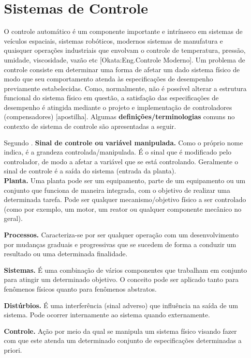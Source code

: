 \section{Sistemas de Controle}
\label{sec:sistema_controle}
O controle automático é um componente importante e intrínseco em sistemas de veículos espaciais, sistemas robóticos, modernos sistemas de manufatura e quaisquer operações industriais que envolvam o controle de temperatura, pressão, umidade, viscosidade, vazão etc \cite{ogata2011engenharia} [Okata:Eng.Controle Moderno]. Um problema de controle consiste em determinar uma forma de afetar um dado sistema físico de modo que seu comportamento atenda às especificações de desempenho previamente estabelecidas. Como, normalmente, não é possível alterar a estrutura funcional do sistema físico em questão, a satisfação das especificações de desempenho é atingida mediante o projeto e implementação de controladores (compensadores) [apostilha]. Algumas \textbf{definições/terminologias} comuns no contexto de sistema de controle são apresentadas a seguir.

Segundo \cite{ogata2011engenharia}.
\textbf{Sinal de controle ou variável manipulada.} Como o próprio nome indica, é a grandeza controlada/manipulada. É o sinal que é modificado pelo controlador, de modo a afetar a variável que se está controlando. Geralmente o sinal de controle é a saída do sistema (entrada da planta).\\

\textbf{Planta.} Uma planta pode ser um equipamento, parte de um equipamento ou um conjunto que funciona de maneira integrada, com o objetivo de realizar uma determinada tarefa. Pode ser qualquer mecanismo/objetivo físico a ser controlado (como por exemplo, um motor, um reator ou qualquer componente mecânico no geral).

\textbf{Processos.} Caracteriza-se por ser qualquer operação com um desenvolvimento por mudanças graduais e progressivas que se sucedem de forma a conduzir um resultado ou uma determinada finalidade.

\textbf{Sistemas.} É uma combinação de vários componentes que trabalham em conjunto para atingir um determinado objetivo. O conceito pode ser aplicado tanto para fenômenos físicos quanto para fenômenos abstratos.

\textbf{Distúrbios.} É uma interferência (sinal adverso) que influência na saída de um sistema. Pode ocorrer internamente ao sistema quando externamente.


\textbf{Controle.} Ação por meio da qual se manipula um sistema físico visando fazer com que este atenda um determinado conjunto de especificações determinadas a priori.

